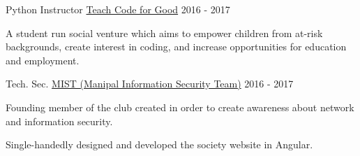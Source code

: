 

\begin{cventries}

  \cventry
    {Python Instructor} %
    {\href{http://www.resolutionproject.org/ventures/teach-code-good}{Teach Code for Good}} %
    {} %
    {2016 - 2017} %
    {
      \begin{cvitems} %
        \item {A student run social venture which aims to empower children from at-risk backgrounds, create interest in coding, and increase opportunities for education and employment.}
      \end{cvitems}
    }

  \cventry
    {Tech. Sec.} %
    {\href{http://wearemist.in}{MIST (Manipal Information Security Team)}} %
    {} %
    {2016 - 2017} %
    {
      \begin{cvitems} %
      	\item {Founding member of the club created in order to create awareness about network and information security.}
        \item {Single-handedly designed and developed the society website in Angular.}
      \end{cvitems}
    }

\end{cventries}
